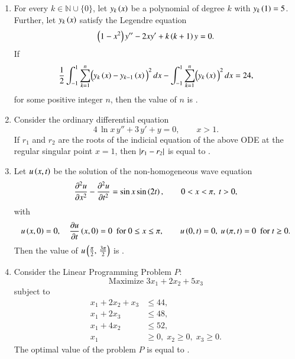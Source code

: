\documentclass[journal,12pt,onecolumn]{IEEEtran}
\theoremstyle{remark}
\begin{document}
\begin{enumerate}[start=1, label=Q.\arabic*]
\item For every $k\in \mathbb{N}\cup\{0\}$, let $y_{k}\left(x\right)$ be a polynomial of degree $k$ with $y_{k}\left(1\right)=5$. Further, let $y_{k}\left(x\right)$ satisfy the Legendre equation
\[
\left(1-x^{2}\right)y''-2xy'+k\left(k+1\right)y=0.
\]
If
\[
\frac{1}{2}\int_{-1}^{1}\sum_{k=1}^{n}\!\Big(y_{k}\left(x\right)-y_{k-1}\left(x\right)\Big)^{2}\,dx-\int_{-1}^{1}\sum_{k=1}^{n}\!\Big(y_{k}\left(x\right)\Big)^{2}\,dx=24,
\]
for some positive integer $n$, then the value of $n$ is \underline{\hspace{2cm}}.

\hfill{}
\item Consider the ordinary differential equation 
\[
4\,\ln x \, y'' + 3\, y' + y = 0,\qquad x>1.
\]
If $r_{1}$ and $r_{2}$ are the roots of the indicial equation of the above ODE at the regular singular point $x=1$, then $\left\vert r_{1}-r_{2}\right\vert$ is equal to \underline{\hspace{2cm}} .

\hfill{}


\item Let $u\left(x,t\right)$ be the solution of the non\mbox{-}homogeneous wave equation
\[
\frac{\partial^{2}u}{\partial x^{2}}-\frac{\partial^{2}u}{\partial t^{2}}=\sin x \sin \left(2t\right), \qquad 0<x<\pi,\ t>0,
\]
with
\[
u\left(x,0\right)=0,\quad \frac{\partial u}{\partial t}\left(x,0\right)=0 \ \text{ for } 0\le x\le \pi,
\qquad
u\left(0,t\right)=0,\  u\left(\pi,t\right)=0 \ \text{ for } t\ge 0.
\]
Then the value of $u\left(\tfrac{\pi}{2},\, \tfrac{3\pi}{2}\right)$ is \underline{\hspace{2cm}} .

\hfill{}
\item Consider the Linear Programming Problem $P$:
\[
\text{Maximize } 3x_{1}+2x_{2}+5x_{3}
\]
subject to
\begin{align*}
x_{1}+2x_{2}+x_{3} &\le 44,\\
x_{1}+2x_{3} &\le 48,\\
x_{1}+4x_{2} &\le 52,\\
x_{1}&\ge 0,\; x_{2}\ge 0,\; x_{3}\ge 0.
\end{align*}
The optimal value of the problem $P$ is equal to \underline{\hspace{2cm}}.

\hfill{}
\end{enumerate}
\end{document}
